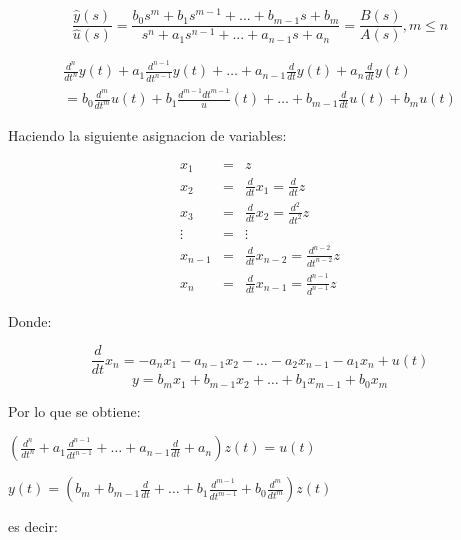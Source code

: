 \documentclass[12pt]{article}
\numberwithin{equation}{subsection}
\begin{document}
\begin{equation}
\frac{\hat{y}(s)}{\hat{u}(s)} = \frac{b_0 s^m + b_1 s^{m-1} + ... + b_{m-1} s + b_m}{s^n + a_1 s^{n-1} + ... + a_{n-1} s + a_n} = \frac{B(s)}{A(s)}, m \le n
\end{equation}

\begin{multline}
\frac{d^n}{dt^n} y(t) + a_1 \frac{d^{n-1}}{dt^{n-1}} y(t) + \dots + a_{n-1} \frac{d}{dt} y(t) + a_n \frac{d}{dt} y(t) \\ = b_0 \frac{d^m}{dt^m} u(t) + b_1 \frac{d^{m-1}{dt^{m-1}}} u(t) + \dots + b_{m-1} \frac{d}{dt} u(t) + b_{m} u(t)
\end{multline}

Haciendo la siguiente asignacion de variables:

\begin{eqnarray}
x_1     & = & z \nonumber \\
x_2     & = & \frac{d}{dt} x_1 = \frac{d}{dt} z \nonumber \\
x_3     & = & \frac{d}{dt} x_2 = \frac{d^2}{dt^2} z \nonumber \\
\vdots  & = & \vdots \nonumber \\
x_{n-1} & = & \frac{d}{dt} x_{n-2} = \frac{d^{n-2}}{dt^{n-2}} z \nonumber \\
x_n     & = & \frac{d}{dt} x_{n-1} = \frac{d^{n-1}}{d^{n-1}} z \nonumber
\end{eqnarray}

Donde:

\begin{equation}
\frac{d}{dt} x_n = -a_n x_1 - a_{n-1} x_2 - \dots - a_2 x_{n-1} - a_1 x_n + u(t)
\end{equation}
\begin{equation}
y = b_m x_1 + b_{m-1} x_2 + \dots + b_1 x_{m-1} + b_0 x_m
\end{equation}

Por lo que se obtiene:

\begin{math}
\left( \frac{d^n}{dt^n} + a_1 \frac{d^{n-1}}{dt^{n-1}} + \dots + a_{n-1} \frac{d}{dt} + a_n \right) z(t) = u(t)
\end{math}

\begin{math}
y(t) = \left( b_m + b_{m-1} \frac{d}{dt} + \dots + b_1 \frac{d^{m-1}}{dt^{m-1}} + b_0 \frac{d^m}{dt^m} \right) z(t)
\end{math}

es decir:
\end{document}
